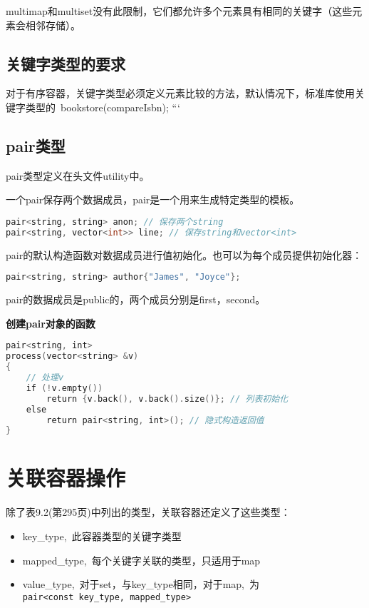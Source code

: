 \documentclass[
  a4paper,
  oneside,tablecaptionabove
]{scrbook}
\begin{document}
multimap和multiset没有此限制，它们都允许多个元素具有相同的关键字（这些元素会相邻存储）。

\subsection{关键字类型的要求}\label{ux5173ux952eux5b57ux7c7bux578bux7684ux8981ux6c42}

对于有序容器，关键字类型必须定义元素比较的方法，默认情况下，标准库使用关键字类型的~bookstore(compareIsbn);
```

\subsection{pair类型}\label{pairux7c7bux578b}

pair类型定义在头文件utility中。

一个pair保存两个数据成员，pair是一个用来生成特定类型的模板。

\begin{lstlisting}[language={C++}]
pair<string, string> anon; // 保存两个string
pair<string, vector<int>> line; // 保存string和vector<int>
\end{lstlisting}

pair的默认构造函数对数据成员进行值初始化。也可以为每个成员提供初始化器：

\begin{lstlisting}[language={C++}]
pair<string, string> author{"James", "Joyce"};
\end{lstlisting}

pair的数据成员是public的，两个成员分别是first，second。

\textbf{创建pair对象的函数}

\begin{lstlisting}[language={C++}]
pair<string, int>
process(vector<string> &v)
{
    // 处理v
    if (!v.empty())
        return {v.back(), v.back().size()}; // 列表初始化
    else
        return pair<string, int>(); // 隐式构造返回值
}
\end{lstlisting}

\section{关联容器操作}\label{ux5173ux8054ux5bb9ux5668ux64cdux4f5c}

除了表9.2(第295页)中列出的类型，关联容器还定义了这些类型：

\begin{itemize}
\item
  key\_type,~此容器类型的关键字类型
\item
  mapped\_type,~每个关键字关联的类型，只适用于map
\item
  value\_type,~对于set，与key\_type相同，对于map,~为\lstinline!pair<const key_type, mapped_type>!
\end{itemize}
\end{document}
